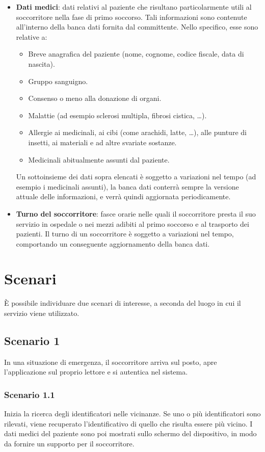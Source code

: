 \documentclass[a4paper,12pt]{report}
\begin{document}
\begin{itemize}
	\item \textbf{Dati medici}: dati relativi al paziente che risultano particolarmente utili al soccorritore nella fase di primo soccorso. Tali informazioni sono contenute all'interno della banca dati fornita dal committente. Nello specifico, esse sono relative a:
	\begin{itemize}
		\item Breve anagrafica del paziente (nome, cognome, codice fiscale, data di nascita).
		\item Gruppo sanguigno.
		\item Consenso o meno alla donazione di organi.
		\item Malattie (ad esempio sclerosi multipla, fibrosi cistica, \dots).
		\item Allergie ai medicinali, ai cibi (come arachidi, latte, \dots), alle punture di insetti, ai materiali e ad altre svariate sostanze.
		\item Medicinali abitualmente assunti dal paziente.
	\end{itemize}
	Un sottoinsieme dei dati sopra elencati è soggetto a variazioni nel tempo (ad esempio i medicinali assunti), la banca dati conterrà sempre la versione attuale delle informazioni, e verrà quindi aggiornata periodicamente.  
	\item \textbf{Turno del soccorritore}: fasce orarie nelle quali il soccorritore presta il suo servizio in ospedale o nei mezzi adibiti al primo soccorso e al trasporto dei pazienti. Il turno di un soccorritore è soggetto a variazioni nel tempo, comportando un conseguente aggiornamento della banca dati.
\end{itemize}

\section{Scenari}
È possibile individuare due scenari di interesse, a seconda del luogo in cui il servizio viene utilizzato.
\subsection{Scenario 1} \label{scenario1}
In una situazione di emergenza, il soccorritore arriva sul posto, apre l'applicazione sul proprio lettore e si autentica nel sistema. 

\subsubsection*{Scenario 1.1}
Inizia la ricerca degli identificatori nelle vicinanze. Se uno o più identificatori sono rilevati, viene recuperato l'identificativo di quello che risulta essere più vicino. I dati medici del paziente sono poi mostrati sullo schermo del dispositivo, in modo da fornire un supporto per il soccorritore.
\end{document}
